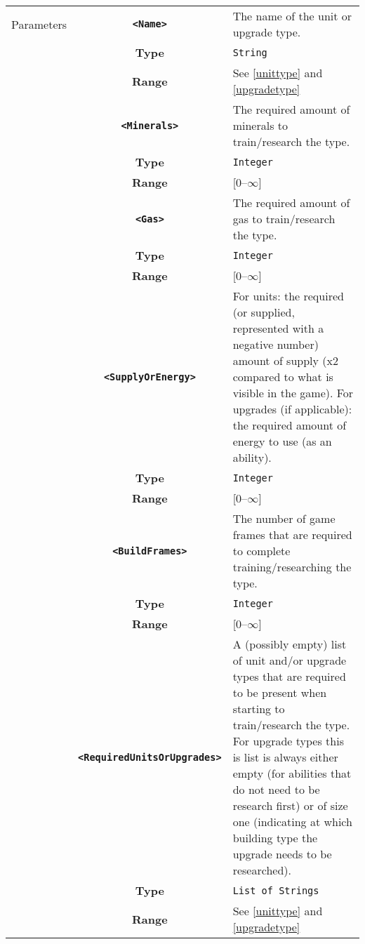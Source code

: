  \begin{tabularx}{\textwidth}{l | c | p{8cm}|}
 \cline{2-3}
 Parameters & \textbf{\verb|<Name>|} & The name of the unit or upgrade type. \\
            & \textbf{Type} & \verb|String| \\
            & \textbf{Range} & See \ref{unittype} and \ref{upgradetype} \\
            \cline{2-3}
            & \textbf{\verb|<Minerals>|} & The required amount of minerals to train/research the type. \\
            & \textbf{Type} & \verb|Integer| \\
            & \textbf{Range} & [0--$\infty$] \\
            \cline{2-3}
            & \textbf{\verb|<Gas>|} & The required amount of gas to train/research the type. \\
            & \textbf{Type} & \verb|Integer| \\
            & \textbf{Range} & [0--$\infty$] \\
            \cline{2-3}
            & \textbf{\verb|<SupplyOrEnergy>|} & For units: the required (or supplied, represented with a negative number) amount of supply (x2 compared to what is visible in the game). For upgrades (if applicable): the required amount of energy to use (as an ability).\\
            & \textbf{Type} & \verb|Integer| \\
            & \textbf{Range} & [0--$\infty$] \\
            \cline{2-3}
            & \textbf{\verb|<BuildFrames>|} & The number of game frames that are required to complete training/researching the type.\\
            & \textbf{Type} & \verb|Integer| \\
            & \textbf{Range} & [0--$\infty$] \\
            \cline{2-3}
            & \textbf{\verb|<RequiredUnitsOrUpgrades>|} & A (possibly empty) list of unit and/or upgrade types that are required to be present when starting to train/research the type. For upgrade types this is list is always either empty (for abilities that do not need to be research first) or of size one (indicating at which building type the upgrade needs to be researched). \\
            & \textbf{Type} & \verb|List of Strings| \\
            & \textbf{Range} & See \ref{unittype} and \ref{upgradetype} \\
            \cline{2-3}
\end{tabularx}


